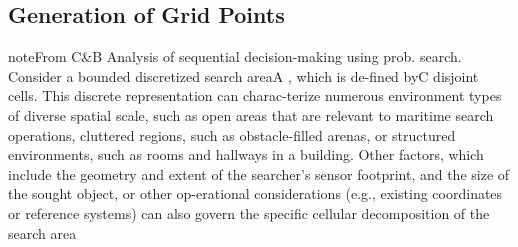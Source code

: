 \subsection{Generation of Grid Points}
note{From C&B Analysis of sequential decision-making using prob. search. Consider a bounded discretized search areaA , which is de-fined byC disjoint cells. This discrete representation can charac-terize numerous environment types of diverse spatial scale, such as open areas that are relevant to maritime search operations, cluttered regions, such as obstacle-filled arenas, or structured environments, such as rooms and hallways in a building. Other factors, which include the geometry and extent of the searcher’s sensor footprint, and the size of the sought object, or other op-erational considerations (e.g., existing coordinates or reference systems) can also govern the specific cellular decomposition of the search area}










